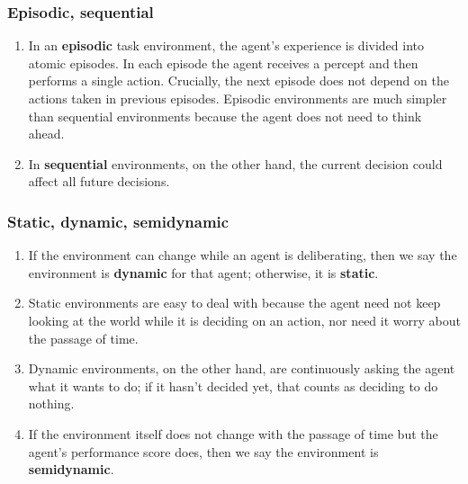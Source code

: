 \subsubsection{Episodic, sequential}
\begin{enumerate}
    \item In an \textbf{episodic} task environment, the agent’s experience is divided into atomic episodes. In each episode the agent receives a percept and then performs a single action. Crucially, the next episode does not depend on the actions taken in previous episodes. Episodic environments are much simpler than sequential environments because the agent does not need to think ahead.
    \hfill \cite{ai/book/Artificial-Intelligence-A-Modern-Approach/Russell-Norvig}

    \item In \textbf{sequential} environments, on the other hand, the current decision could affect all future decisions.
    \hfill \cite{ai/book/Artificial-Intelligence-A-Modern-Approach/Russell-Norvig}
\end{enumerate}


\subsubsection{Static, dynamic, semidynamic}
\begin{enumerate}
    \item If the environment can change while an agent is deliberating, then we say the environment is \textbf{dynamic} for that agent; otherwise, it is \textbf{static}.
    \hfill \cite{ai/book/Artificial-Intelligence-A-Modern-Approach/Russell-Norvig}

    \item Static environments are easy to deal with because the agent need not keep looking at the world while it is deciding on an action, nor need it worry about the passage of time.
    \hfill \cite{ai/book/Artificial-Intelligence-A-Modern-Approach/Russell-Norvig}

    \item  Dynamic environments, on the other hand, are continuously asking the agent what it wants to do; if it hasn’t decided yet, that counts as deciding to do nothing.
    \hfill \cite{ai/book/Artificial-Intelligence-A-Modern-Approach/Russell-Norvig}

    \item If the environment itself does not change with the passage of time but the agent’s performance score does, then we say the environment is \textbf{semidynamic}.
    \hfill \cite{ai/book/Artificial-Intelligence-A-Modern-Approach/Russell-Norvig}
\end{enumerate}


